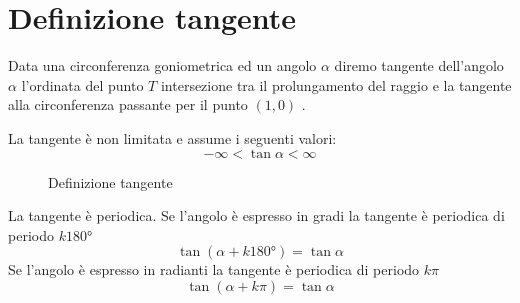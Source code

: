 \section{Definizione tangente}
\begin{defn}
	Data una circonferenza goniometrica ed un angolo $\alpha$ diremo tangente dell'angolo $\alpha$ l'ordinata del punto $T$ intersezione tra il prolungamento del raggio e la tangente alla circonferenza passante per il punto $(1,0)$  .
\end{defn}
\begin{prop}\label{prop:tangentenonlimitata}
La tangente è non limitata e assume i seguenti valori:
\begin{equation*}
-\infty<\tan\alpha<\infty
\end{equation*}
\end{prop}
\begin{figure}
	\centering
	
	\caption{Definizione tangente}
	\label{fig:tangentedefinizione}
\end{figure}
%	
\begin{prop}\label{prop:PeriodoTangente}
	La tangente è periodica.
	Se l'angolo è espresso in gradi la tangente è periodica di periodo $k\ang{180}$
	\begin{equation*}
	\tan(\alpha+k\ang{180;;})=\tan\alpha
	\end{equation*}
	Se l'angolo è espresso in radianti la tangente è periodica di periodo $k\pi$
	\begin{equation*}
	\tan(\alpha+k\pi)=\tan\alpha
	\end{equation*}
\end{prop}
